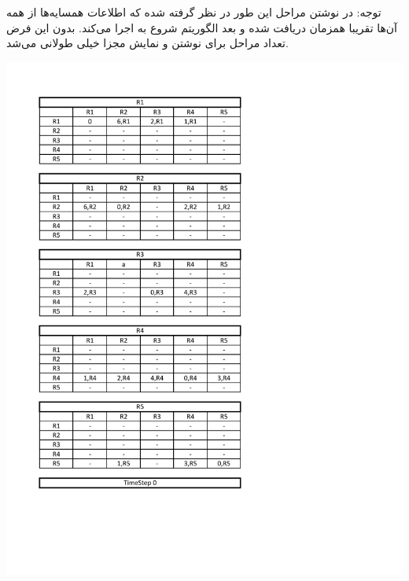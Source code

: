 \documentclass[12pt]{article}
\begin{document}
 توجه: در نوشتن مراحل این طور در نظر گرفته شده که اطلاعات همسایه‌ها از همه آن‌ها تقریبا همزمان دریافت شده و بعد الگوریتم شروع به اجرا می‌کند. بدون این فرض تعداد مراحل  برای نوشتن و نمایش مجزا خیلی طولانی می‌شد.
 \newpage
 \begin{center}
 \includegraphics[width = 1.0 \textwidth]{images/1.pdf}
 \end{center}
\end{document}
